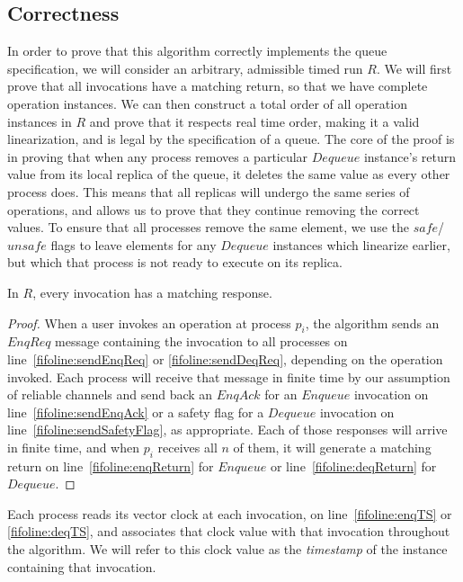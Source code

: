 \documentclass[a4paper,anonymous,USenglish]{lipics-v2021}
\theoremstyle{definition}
\begin{document}
\subsection{Correctness}\label{sec:fifoCorrectness}
In order to prove that this algorithm correctly implements the queue specification, we will consider an arbitrary, admissible timed run $R$.  We will first prove that all invocations have a matching return, so that we have complete operation instances.  We can then construct a total order of all operation instances in $R$ and prove that it respects real time order, making it a valid linearization, and is legal by the specification of a queue.  The core of the proof is in proving that when any process removes a particular $Dequeue$ instance's return value from its local replica of the queue, it deletes the same value as every other process does.  This means that all replicas will undergo the same series of operations, and allows us to prove that they continue removing the correct values.  To ensure that all processes remove the same element, we use the $safe$/$unsafe$ flags to leave elements for any $Dequeue$ instances which linearize earlier, but which that process is not ready to execute on its replica.

\begin{lemma}\label{fifolem:responses}
  In $R$, every invocation has a matching response.
\end{lemma}

\begin{proof}
When a user invokes an operation at process $p_i$, the algorithm sends an $EnqReq$ message containing the invocation to all processes on line~\ref{fifoline:sendEnqReq} or \ref{fifoline:sendDeqReq}, depending on the operation invoked.  Each process will receive that message in finite time by our assumption of reliable channels and send back an $EnqAck$ for an $Enqueue$ invocation on line~\ref{fifoline:sendEnqAck} or a safety flag for a $Dequeue$ invocation on line~\ref{fifoline:sendSafetyFlag}, as appropriate.  Each of those responses will arrive in finite time, and when $p_i$ receives all $n$ of them, it will generate a matching return on line~\ref{fifoline:enqReturn} for $Enqueue$ or line~\ref{fifoline:deqReturn} for $Dequeue$.
\end{proof}

Each process reads its vector clock at each invocation, on line~\ref{fifoline:enqTS} or \ref{fifoline:deqTS}, and associates that clock value with that invocation throughout the algorithm.  We will refer to this clock value as the \emph{timestamp} of the instance containing that invocation.
\end{document}
